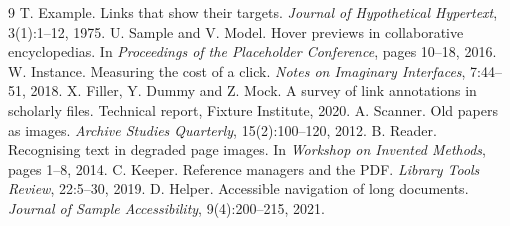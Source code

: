 \clearpage
\begin{thebibliography}{9}
 T. Example. Links that show their targets. \emph{Journal of
  Hypothetical Hypertext}, 3(1):1--12, 1975.
 U. Sample and V. Model. Hover previews in collaborative
  encyclopedias. In \emph{Proceedings of the Placeholder Conference},
  pages 10--18, 2016.
 W. Instance. Measuring the cost of a click. \emph{Notes on
  Imaginary Interfaces}, 7:44--51, 2018.
 X. Filler, Y. Dummy and Z. Mock. A survey of link
  annotations in scholarly files. Technical report, Fixture Institute, 2020.
 A. Scanner. Old papers as images. \emph{Archive Studies
  Quarterly}, 15(2):100--120, 2012.
 B. Reader. Recognising text in degraded page images. In
  \emph{Workshop on Invented Methods}, pages 1--8, 2014.
 C. Keeper. Reference managers and the PDF. \emph{Library
  Tools Review}, 22:5--30, 2019.
 D. Helper. Accessible navigation of long documents.
  \emph{Journal of Sample Accessibility}, 9(4):200--215, 2021.
\end{thebibliography}


